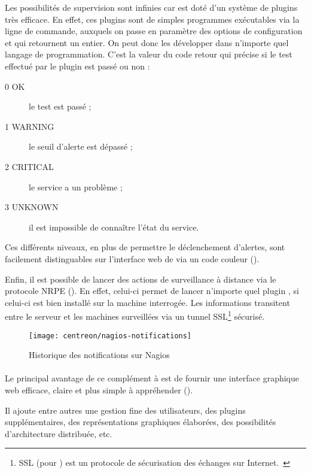 Les possibilités de supervision sont infinies car \anagios{} est doté d'un système de plugins très efficace.
En effet, ces plugins sont de simples programmes exécutables via la ligne de commande, auxquels on passe en paramètre des options de configuration et qui retournent un entier.
On peut donc les développer dans n'importe quel langage de programmation.
C'est la valeur du code retour qui précise si le test effectué par le plugin est passé ou non :

\begin{description}
	\item[0 OK] le test est passé ;
	\item[1 WARNING] le seuil d'alerte est dépassé ;
	\item[2 CRITICAL] le service a un problème ;
	\item[3 UNKNOWN] il est impossible de connaître l'état du service.
\end{description}

Ces différents niveaux, en plus de permettre le déclenchement d'alertes, sont facilement distinguables sur l'interface web de \anagios{} via un code couleur ().

Enfin, il est possible de lancer des actions de surveillance à distance via le protocole NRPE ().
En effet, celui-ci permet de lancer n'importe quel plugin \anagios{}, si celui-ci est bien installé sur la machine interrogée.
Les informations transitent entre le serveur \anagios{} et les machines surveillées via un tunnel SSL\footnote{SSL (pour ) est un protocole de sécurisation des échanges sur Internet.~\cite{tls}} sécurisé.

\begin{figure}
	\centering
	\texttt{[image: centreon/nagios-notifications]}
	\caption{Historique des notifications sur Nagios}
	\label{figure:centreon:nagios}
\end{figure}

\paragraph{\acentreon}
Le principal avantage de ce complément à \anagios{} est de fournir une interface graphique web efficace, claire et plus simple à appréhender ().

Il ajoute entre autres une gestion fine des utilisateurs, des plugins \anagios{} supplémentaires, des représentations graphiques élaborées, des possibilités d'architecture distribuée, etc.

